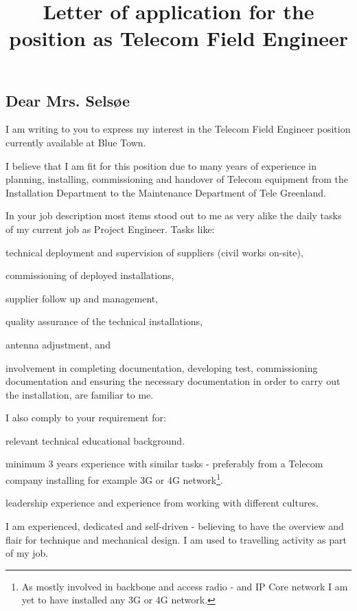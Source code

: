\documentclass[11pt,a4paper,twoside]{article}
\title{Letter of application for the\\ position as Telecom Field Engineer}
\begin{document}
\maketitle
\subsection*{Dear Mrs. Selsøe}
I am writing to you to express my interest in the Telecom Field Engineer position currently available at Blue Town.
\par
I believe that I am fit for this position due to many years of experience in planning, installing, commissioning and handover of Telecom equipment from the Installation Department to the Maintenance Department of Tele Greenland.
\par
In your job description most items stood out to me as very alike the daily tasks of my current job as Project Engineer. Tasks like:
\begin{compactitem}
\item technical deployment and supervision of suppliers (civil works on-site),
\item commissioning of deployed installations,
\item supplier follow up and management,
\item quality assurance of the technical installations,
\item antenna adjustment, and
\item involvement in completing documentation, developing test, commissioning documentation and ensuring the necessary documentation in order to carry out the installation, are familiar to me.
\end{compactitem}
\par
I also comply to your requirement for:
\begin{compactitem}
\item relevant technical educational background. 
\item minimum 3 years experience with similar tasks - preferably from a Telecom company installing for example 3G or 4G network\footnote{As mostly involved in backbone and access radio - and IP Core network I am yet to have installed any 3G or 4G network.}.
\item leadership experience and experience from working with different cultures.
\end{compactitem}
\par
I am experienced, dedicated and self-driven - believing to have the overview and flair for technique and mechanical design. I am used to travelling activity as part of my job.
\end{document}
